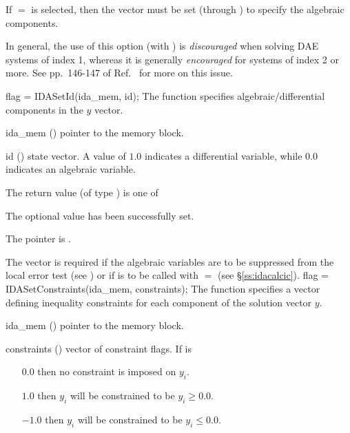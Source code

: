 {{  If $=$ is selected, then the  vector
  must be set (through ) to specify the algebraic components.

  In general, the use of this option (with ) is
  {\em discouraged} when solving DAE systems of index 1, whereas it is
  generally {\em encouraged} for systems of index 2 or more.
  See pp.~146-147 of Ref.~\cite{BCP:96} for more on this issue.
}
{
flag = IDASetId(ida\_mem, id);
}
{
  The function  specifies algebraic/differential
  components in the $y$ vector.
}
{
  \begin{args}
  \item[ida\_mem] ()
    pointer to the {\idas} memory block.
  \item[id] ()
    state vector. A value of $1.0$ indicates a differential variable, while
    $0.0$ indicates an algebraic variable.
  \end{args}
}
{
  The return value  (of type ) is one of
  \begin{args}
  \item[\Id{IDA\_SUCCESS}]
    The optional value has been successfully set.
  \item[\Id{IDA\_MEM\_NULL}]
    The  pointer is .
  \end{args}
}
{
  The vector  is required if the algebraic variables are to be
  suppressed from the local error test (see ) or
  if  is to be called with  $=$ 
  (see \S\ref{ss:idacalcic}).
}
{
flag = IDASetConstraints(ida\_mem, constraints);
}
{
  The function  specifies a vector defining
  inequality constraints for each component of the solution vector $y$.
}
{
  \begin{args}
  \item[ida\_mem] ()
    pointer to the {\idas} memory block.
  \item[constraints] ()
    vector of constraint flags. If  is
    \begin{itemize}
    \item[$0.0$] then no constraint is imposed on $y_i$.
    \item[$1.0$] then $y_i$ will be constrained to be $y_i \ge 0.0$.
    \item[$-1.0$] then $y_i$ will be constrained to be $y_i \le 0.0$.

\end{itemize}
\end{args}}}
